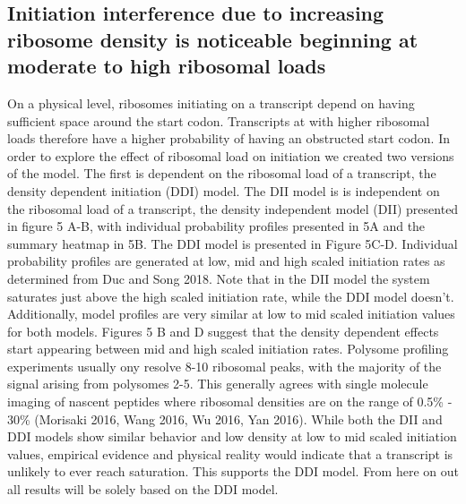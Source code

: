 \documentclass[review]{elsarticle}
\begin{document}
\subsection{Initiation interference due to increasing ribosome density is noticeable beginning at moderate to high ribosomal loads }

 On a physical level, ribosomes initiating on a transcript depend on having sufficient space around the start codon. Transcripts at with higher ribosomal loads therefore have a higher probability of having an obstructed start codon. In order to explore the effect of ribosomal load on initiation we created two versions of the model. The first is dependent on the ribosomal load of a transcript, the density dependent initiation (DDI) model. The DII model is is independent on the ribosomal load of a transcript, the density independent model (DII) presented in figure 5 A-B, with individual probability profiles presented in 5A and the summary heatmap in 5B. The DDI model is presented in Figure 5C-D. Individual probability profiles are generated at low, mid and high scaled initiation rates as determined from Duc and Song 2018. Note that in the DII model the system saturates just above the high scaled initiation rate, while the DDI model doesn't. Additionally, model profiles are very similar at low to mid scaled initiation values for both models. Figures 5 B and D suggest that the density dependent effects start appearing between mid and high scaled initiation rates. Polysome profiling experiments usually ony resolve 8-10 ribosomal peaks, with the majority of the signal arising from polysomes 2-5. This generally agrees with single molecule imaging of nascent peptides where ribosomal densities are on the range of 0.5\% - 30\% (Morisaki 2016, Wang 2016, Wu 2016, Yan 2016). While both the DII and DDI models show similar behavior and low density at low to mid scaled initiation values, empirical evidence and physical reality would indicate that a transcript is unlikely to ever reach saturation. This supports the DDI model. From here on out all results will be solely based on the DDI model.
\end{document}

